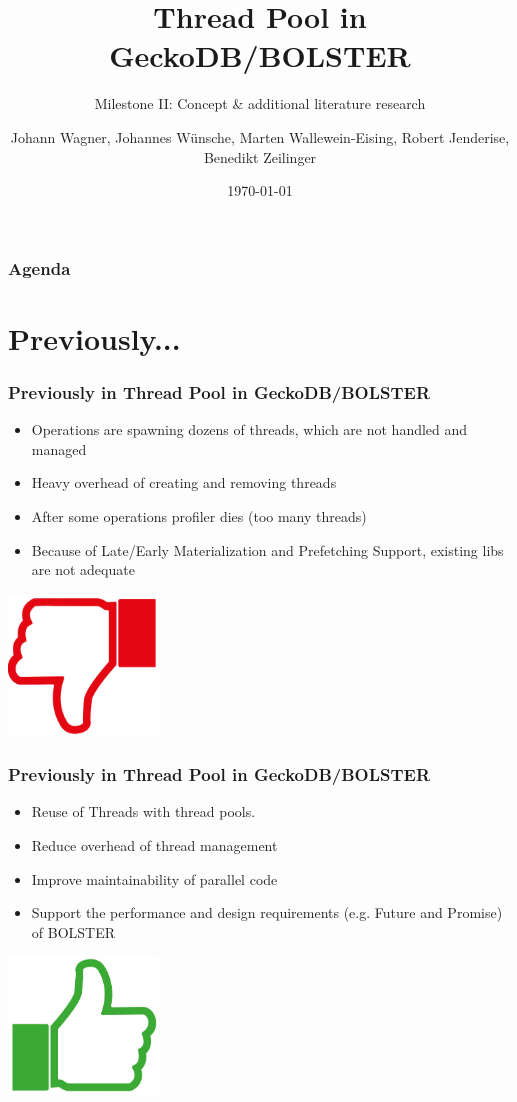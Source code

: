 \documentclass{beamer}
\title{Thread Pool in GeckoDB/BOLSTER}
\subtitle{Milestone II: Concept \& additional literature research}
\author{Johann Wagner, Johannes Wünsche, Marten Wallewein-Eising, Robert Jenderise, Benedikt Zeilinger}
\date{\today}
\institute{Otto von Guericke University, Magdeburg}
\begin{document}
\begin{frame}[plain]
 \titlepage
\end{frame}

\section[Agenda]{}
	\begin{frame}
	\frametitle{Agenda}
	\tableofcontents
	\end{frame}

\section{Previously...}
\begin{frame}
	\frametitle{Previously in Thread Pool in GeckoDB/BOLSTER}
	\begin{itemize}
		\item Operations are spawning dozens of threads, which are not handled and managed
		\item Heavy overhead of creating and removing threads
		\item After some operations profiler dies (too many threads)
		\item Because of Late/Early Materialization and Prefetching Support, existing libs are not adequate
	\end{itemize}
	\begin{center}
		\includegraphics[width=0.3\textwidth]{img/thumbs_down.png}
	\end{center}
\end{frame}

\begin{frame}
	\frametitle{Previously in Thread Pool in GeckoDB/BOLSTER}
	\begin{itemize}
		\item Reuse of Threads with thread pools.
		\item Reduce overhead of thread management
		\item Improve maintainability of parallel code
		\item Support the performance and design requirements (e.g. Future and Promise) of BOLSTER
	\end{itemize}
	\begin{center}
		\includegraphics[width=0.3\textwidth]{img/thumbs_up.png}
	\end{center}
\end{frame}
\end{document}

